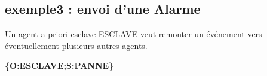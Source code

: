 \documentclass[french]{article}
\begin{document}
\subsection{exemple3 : envoi d'une Alarme}
Un agent a priori esclave ESCLAVE veut remonter un événement vers éventuellement plusieurs autres agents.
\begin{center}
	\textbf{\{O:ESCLAVE;S:PANNE\}}
\end{center}
\end{document}
